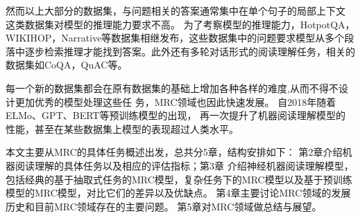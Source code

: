 然而以上大部分的数据集，与问题相关的答案通常集中在单个句子的局部上下文
这类数据集对模型的推理能力要求不高。
为了考察模型的推理能力，HotpotQA，WIKIHOP，Narrative等数据集相继发布，这些数据集中的问题要求模型从多个段落中逐步检索推理才能找到答案。此外还有多轮对话形式的阅读理解任务，相关的数据集如CoQA，QuAC等。

每一个新的数据集都会在原有数据集的基础上增加各种各样的难度,从而不得不设计更加优秀的模型处理这些任
务，MRC领域也因此快速发展。
自2018年随着ELMo、GPT、BERT等预训练模型的出现，
再一次提升了机器阅读理解模型的性能，甚至在某些数据集上模型的表现超过人类水平。

本文主要从MRC的具体任务概述出发，总共分5章，结构安排如下：
第2章介绍机器阅读理解的具体任务以及相应的评估指标；第3章
介绍神经机器阅读理解模型，包括经典的基于抽取式任务的MRC模型，复杂任务下的MRC模型以及基于预训练模型的MRC模型，对比它们的差异以及优缺点。
第4章主要讨论MRC领域的发展历史和目前MRC领域存在的主要问题。
第5章对MRC领域做总结与展望。
